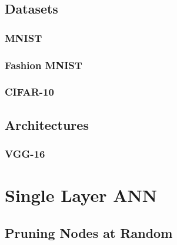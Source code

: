 \documentclass[UKenglish]{ifimaster}
\begin{document}
    
    \section{Datasets}
        \subsection{MNIST}


        \subsection{Fashion MNIST}


        \subsection{CIFAR-10}


    \section{Architectures}
        \subsection{VGG-16}

\chapter{Single Layer ANN}
    \section{Pruning Nodes at Random}
\end{document}
